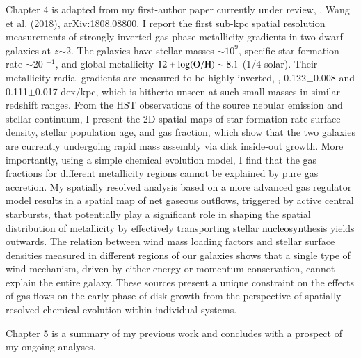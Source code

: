 Chapter 4 is adapted from my first-author paper currently under review, \ie, Wang et al. (2018), arXiv:1808.08800.
I report the first sub-kpc spatial resolution measurements of strongly inverted gas-phase 
metallicity gradients in two dwarf galaxies at $z$$\sim$2.
The galaxies have stellar masses $\sim$$10^9$\Msun, specific star-formation rate $\sim$20 \Gyr$^{-1}$, and 
global metallicity $12+\log({\rm O/H})\sim8.1$ (1/4 solar).
Their metallicity radial gradients are measured to be highly inverted, \ie, 0.122$\pm$0.008 and 
0.111$\pm$0.017 dex/kpc, which is hitherto unseen at such small masses in similar redshift ranges.
From the HST observations of the source nebular emission and stellar continuum, I
present the 2D spatial maps of star-formation rate surface density, stellar population age, and 
gas fraction, which show that the two galaxies are currently undergoing rapid mass assembly via disk 
inside-out growth.  More importantly, using a simple chemical evolution model, I find that the gas 
fractions for different metallicity regions cannot be explained by pure gas accretion.  My spatially 
resolved analysis based on a more advanced gas regulator model results in a spatial map of net gaseous 
outflows, triggered by active central starbursts, that potentially play a significant role in shaping the 
spatial distribution of metallicity by effectively transporting stellar nucleosynthesis yields outwards.  
The relation between wind mass loading factors and stellar surface densities measured in different regions 
of our galaxies shows that a single type of wind mechanism, driven by either energy or momentum 
conservation, cannot explain the entire galaxy.  These sources present a unique constraint on the effects 
of gas flows on the early phase of disk growth from the perspective of spatially resolved chemical 
evolution within individual systems.

Chapter 5 is a summary of my previous work and concludes with a prospect of my ongoing analyses.


